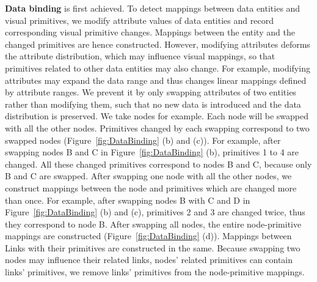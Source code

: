 


\textbf{Data binding} is first achieved.
To detect mappings between data entities and visual primitives, 
we modify attribute values of data entities and record corresponding visual primitive changes.
Mappings between the entity and the changed primitives are hence constructed.
However, modifying attributes deforms the attribute distribution, which may influence visual mappings, so that primitives related to other data entities may also change.
For example, modifying attributes may expand the data range and thus changes linear mappings defined by attribute ranges.
We prevent it by only swapping attributes of two entities rather than modifying them, such that no new data is introduced and the data distribution is preserved.
We take nodes for example.
Each node will be swapped with all the other nodes.
Primitives changed by each swapping correspond to two swapped nodes (Figure~\ref{fig:DataBinding} (b) and (c)).
For example, after swapping nodes B and C in Figure~\ref{fig:DataBinding} (b), primitives 1 to 4 are changed.
All these changed primitives correspond to nodes B and C, because only B and C are swapped.
After swapping one node with all the other nodes, we construct mappings between the node and primitives which are changed more than once.
For example, after swapping nodes B with C and D in Figure~\ref{fig:DataBinding} (b) and (c), primitives 2 and 3 are changed twice, thus they correspond to node B.
After swapping all nodes, the entire node-primitive mappings are constructed (Figure~\ref{fig:DataBinding} (d)).
Mappings between Links with their primitives are constructed in the same.
Because swapping two nodes may influence their related links, nodes' related primitives can contain links' primitives,
we remove links' primitives from the node-primitive mappings.

